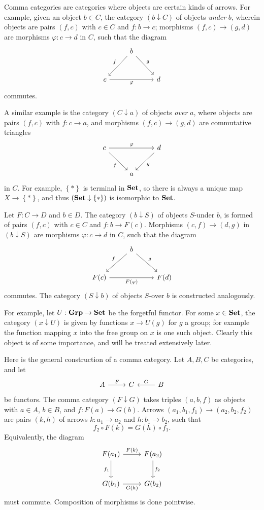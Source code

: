 Comma categories are categories where objects are certain kinds of arrows. For example, given an object $b\in C$, the category $(b\downarrow C)$ of objects \emph{under} $b$, wherein objects are pairs $(f,c)$ with $c\in C$ and $f : b \to c$; morphisms $(f,c)\to (g,d)$ are morphisms $\varphi : c \to d$ in $C$, such that the diagram
\[\begin{tikzcd}[row sep = 2.5em, column sep = 2.5em]
 & b \ar[" f "', dl] \ar[" g ", dr]  &  \\
c\ar[" \varphi  "', rr]  &  & d
\end{tikzcd}\]
commutes.

A similar example is the category $(C\downarrow a)$ of objects \emph{over} $a$, where objects are pairs $(f,c)$ with $f : c \to a$, and morphisms $(f,c)\to (g,d)$ are commutative triangles
\[\begin{tikzcd}[row sep = 2.5em, column sep = 2.5em]
c\ar[" \varphi  ", rr] \ar[" f "', dr]  &  & d\ar[" g ", dl]  \\
 & a & 
\end{tikzcd}\]
in $C$. For example, $\left\{ * \right\} $ is terminal in $\mathbf{Set} $, so there is always a unique map $X\to \left\{ * \right\} $, and thus $(\mathbf{Set} \downarrow \left\{ * \right\} )$ is isomorphic to $\mathbf{Set} $.

Let $F : C \to D$ and $b\in D$. The category $(b\downarrow S)$ of objects $S$-under $b$, is formed of pairs $(f,c)$ with $c\in C$ and $f : b \to F(c)$. Morphisms $(c,f)\to (d,g)$ in $(b\downarrow S)$ are morphisms $\varphi : c \to d$ in $C$, such that the diagram
\[\begin{tikzcd}[row sep = 2.5em, column sep = 2.5em]
 & b \ar[" g ", dr] \ar[" f "', dl]  &  \\
F(c)\ar[" F(\varphi ) "', rr]  &  & F(d)
\end{tikzcd}\]
commutes. The category $(S\downarrow b)$ of objects $S$-over $b$ is constructed analogously.

For example, let $U : \mathbf{Grp}  \to \mathbf{Set} $ be the forgetful functor. For some $x\in \mathbf{Set} $, the category $(x\downarrow U)$ is given by functions $x\to U(g)$ for $g$ a group; for example the function mapping $x$ into the free group on $x$ is one such object. Clearly this object is of some importance, and will be treated extensively later.

Here is the general construction of a comma category. Let $A,B,C$ be categories, and let
\[\begin{tikzcd}[row sep = 2.5em, column sep = 2.5em]
A\ar[" F ", r]  & C & B \ar[" G "', l] 
\end{tikzcd}\]
be functors. The comma category $(F\downarrow G)$ takes triples $(a,b,f)$ as objects with $a\in A$, $b\in B$, and $f : F(a) \to G(b)$. Arrows $(a_1,b_1,f_1)\to (a_2,b_2,f_2)$ are pairs $(k,h)$ of arrows $k : a_1 \to a_2$ and $h : b_1 \to b_2$, such that
\[
	f_2 \circ F(k)=G(h)\circ f_1
.\]
Equivalently, the diagram
\[\begin{tikzcd}[row sep = 2.5em, column sep = 2.5em]
F(a_1)\ar[" F(k) ", r] \ar[" f_1 "', d]  & F(a_2)\ar[" f_2 ", d]  \\
G(b_1)\ar[" G(h) "', r]  & G(b_2)
\end{tikzcd}\]
must commute. Composition of morphisms is done pointwise.

